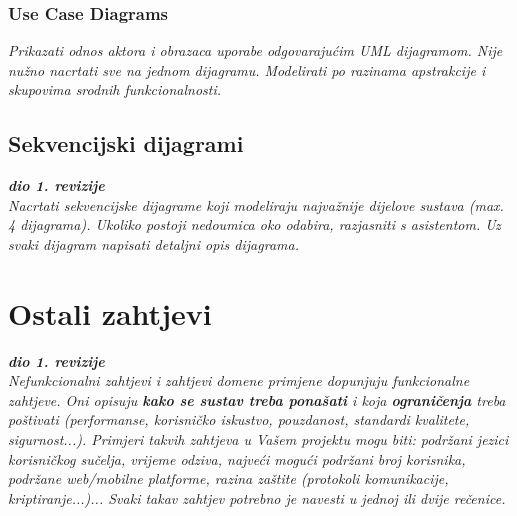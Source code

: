 			\subsubsection{Use Case Diagrams}
					
					\textit{Prikazati odnos aktora i obrazaca uporabe odgovarajućim UML dijagramom. Nije nužno nacrtati sve na jednom dijagramu. Modelirati po razinama apstrakcije i skupovima srodnih funkcionalnosti.}
				\eject		
				
			\subsection{Sekvencijski dijagrami}
				
				\textbf{\textit{dio 1. revizije}}\\
				
				\textit{Nacrtati sekvencijske dijagrame koji modeliraju najvažnije dijelove sustava (max. 4 dijagrama). Ukoliko postoji nedoumica oko odabira, razjasniti s asistentom. Uz svaki dijagram napisati detaljni opis dijagrama.}
				\eject
	
		\section{Ostali zahtjevi}
		
			\textbf{\textit{dio 1. revizije}}\\
		 
			 \textit{Nefunkcionalni zahtjevi i zahtjevi domene primjene dopunjuju funkcionalne zahtjeve. Oni opisuju \textbf{kako se sustav treba ponašati} i koja \textbf{ograničenja} treba poštivati (performanse, korisničko iskustvo, pouzdanost, standardi kvalitete, sigurnost...). Primjeri takvih zahtjeva u Vašem projektu mogu biti: podržani jezici korisničkog sučelja, vrijeme odziva, najveći mogući podržani broj korisnika, podržane web/mobilne platforme, razina zaštite (protokoli komunikacije, kriptiranje...)... Svaki takav zahtjev potrebno je navesti u jednoj ili dvije rečenice.}
			 
			 
			 
	